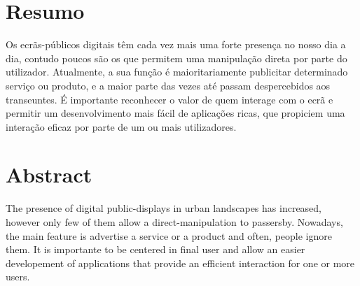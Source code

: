 \chapter*{Resumo}

Os ecrãs-públicos digitais têm cada vez mais uma forte presença no nosso dia a dia, contudo poucos são os que permitem uma manipulação direta por parte do utilizador. Atualmente, a sua função é maioritariamente publicitar determinado serviço ou produto, e a maior parte das vezes até passam despercebidos aos transeuntes.
É importante reconhecer o valor de quem interage com o ecrã e permitir um desenvolvimento mais fácil de aplicações ricas, que propiciem uma interação eficaz por parte de um ou mais utilizadores. 

\chapter*{Abstract}

The presence of digital public-displays in urban landscapes has increased, however only few of them allow a direct-manipulation to passersby. Nowadays, the main feature is advertise a service or a product and often, people ignore them. 
It is importante to be centered in final user and allow an easier developement of applications that provide an efficient interaction for one or more users. 
